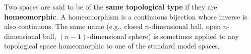 Two spaces are said to be of the \textbf{same topological type} if they are \textbf{homeomorphic}. A homeomorphism is a continuous bijection whose inverse is also continuous. The same name (e.g., closed $n$-dimensional ball, open $n$-dimensional ball, $(n-1)$-dimensional sphere) is sometimes applied to any topological space homeomorphic to one of the standard model spaces.
